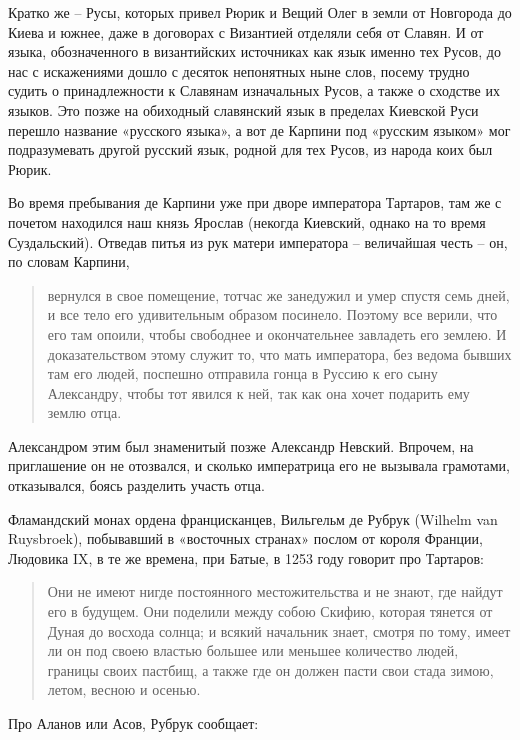 Кратко же – Русы, которых привел Рюрик и Вещий Олег в земли от Новгорода до Киева и южнее, даже в договорах с Византией отделяли себя от Славян. И от языка, обозначенного в византийских источниках как язык именно тех Русов, до нас с искажениями дошло с десяток непонятных ныне слов, посему трудно судить о принадлежности к Славянам изначальных Русов, а также о сходстве их языков. Это позже на обиходный славянский язык в пределах Киевской Руси перешло название «русского языка», а вот де Карпини под «русским языком» мог подразумевать другой русский язык, родной для тех Русов, из народа коих был Рюрик.

Во время пребывания де Карпини уже при дворе императора Тартаров, там же с почетом находился наш князь Ярослав (некогда Киевский, однако на то время Суздальский). Отведав питья из рук матери императора – величайшая честь – он, по словам Карпини,

\begin{quotation}
вернулся в свое помещение, тотчас же занедужил и умер спустя семь дней, и все тело его удивительным образом посинело. Поэтому все верили, что его там опоили, чтобы свободнее и окончательнее завладеть его землею. И доказательством этому служит то, что мать императора, без ведома бывших там его людей, поспешно отправила гонца в Руссию к его сыну Александру, чтобы тот явился к ней, так как она хочет подарить ему землю отца.
\end{quotation}

Александром этим был знаменитый позже Александр Невский. Впрочем, на приглашение он не отозвался, и сколько императрица его не вызывала грамотами, отказывался, боясь разделить участь отца.

Фламандский монах ордена францисканцев, Вильгельм де Рубрук (Wilhelm van Ruysbroek), побывавший в «восточных странах» послом от короля Франции, Людовика IX, в те же времена, при Батые, в 1253 году говорит про Тартаров\cite{karpini}:

\begin{quotation}
Они не имеют нигде постоянного местожительства и не знают, где найдут его в будущем. Они поделили между собою Скифию, которая тянется от Дуная до восхода солнца; и всякий начальник знает, смотря по тому, имеет ли он под своею властью большее или меньшее количество людей, границы своих пастбищ, а также где он должен пасти свои стада зимою, летом, весною и осенью.
\end{quotation}

Про Аланов или Асов, Рубрук сообщает:

